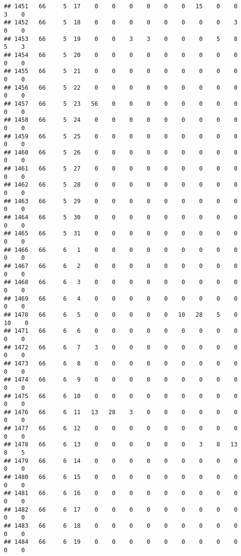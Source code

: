 \documentclass[]{article}
\begin{document}
\begin{verbatim}
## 1451   66     5  17    0    0    0    0    0    0   15    0    0    3    0
## 1452   66     5  18    0    0    0    0    0    0    0    0    3    0    0
## 1453   66     5  19    0    0    3    3    0    0    0    5    8    5    3
## 1454   66     5  20    0    0    0    0    0    0    0    0    0    0    0
## 1455   66     5  21    0    0    0    0    0    0    0    0    0    0    0
## 1456   66     5  22    0    0    0    0    0    0    0    0    0    0    0
## 1457   66     5  23   56    0    0    0    0    0    0    0    0    0    0
## 1458   66     5  24    0    0    0    0    0    0    0    0    0    0    0
## 1459   66     5  25    0    0    0    0    0    0    0    0    0    0    0
## 1460   66     5  26    0    0    0    0    0    0    0    0    0    0    0
## 1461   66     5  27    0    0    0    0    0    0    0    0    0    0    0
## 1462   66     5  28    0    0    0    0    0    0    0    0    0    0    0
## 1463   66     5  29    0    0    0    0    0    0    0    0    0    0    0
## 1464   66     5  30    0    0    0    0    0    0    0    0    0    0    0
## 1465   66     5  31    0    0    0    0    0    0    0    0    0    0    0
## 1466   66     6   1    0    0    0    0    0    0    0    0    0    0    0
## 1467   66     6   2    0    0    0    0    0    0    0    0    0    0    0
## 1468   66     6   3    0    0    0    0    0    0    0    0    0    0    0
## 1469   66     6   4    0    0    0    0    0    0    0    0    0    0    0
## 1470   66     6   5    0    0    0    0    0   10   28    5    0   10    0
## 1471   66     6   6    0    0    0    0    0    0    0    0    0    0    0
## 1472   66     6   7    3    0    0    0    0    0    0    0    0    0    0
## 1473   66     6   8    0    0    0    0    0    0    0    0    0    0    0
## 1474   66     6   9    0    0    0    0    0    0    0    0    0    0    0
## 1475   66     6  10    0    0    0    0    0    0    0    0    0    0    0
## 1476   66     6  11   13   28    3    0    0    0    0    0    0    0    0
## 1477   66     6  12    0    0    0    0    0    0    0    0    0    0    0
## 1478   66     6  13    0    0    0    0    0    0    3    8   13    8    5
## 1479   66     6  14    0    0    0    0    0    0    0    0    0    0    0
## 1480   66     6  15    0    0    0    0    0    0    0    0    0    0    0
## 1481   66     6  16    0    0    0    0    0    0    0    0    0    0    0
## 1482   66     6  17    0    0    0    0    0    0    0    0    0    0    0
## 1483   66     6  18    0    0    0    0    0    0    0    0    0    0    0
## 1484   66     6  19    0    0    0    0    0    0    0    0    0    0    0

\end{verbatim}
\end{document}
